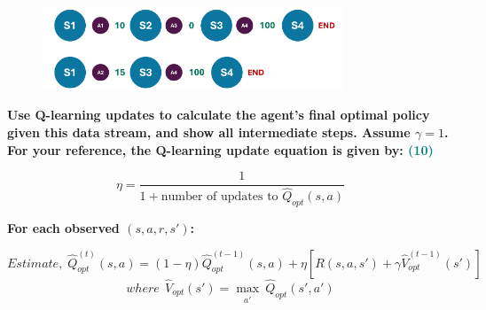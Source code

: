 \documentclass[a4paper]{article}
\begin{document}
\begin{sloppypar}
\begin{enumerate}[start=8,label=Q\arabic*,left=0pt]
    \begin{figure}[H]
        \centering  
        \includegraphics[width=0.8\textwidth]{Q11_mdp.png}
        \label{fig:Q11_mdp}
    \end{figure}

    \textbf{Use Q-learning updates to calculate the agent’s final optimal policy given this data stream,
    and show all intermediate steps. Assume $\gamma = 1$. For your reference, the Q-learning update equation is given by: \hfill \textcolor{teal}{(10)}}
    
    \[ \eta = \frac{1}{1 + \text{number of updates to } \hat{Q}_{opt}(s, a)} \]

    \textbf{For each observed $(s, a, r, s')$:}

    \[ Estimate, \; \hat{Q}^{(t)}_{opt}(s, a) = (1 - \eta) \hat{Q}^{(t-1)}_{opt}(s, a) + \eta[R(s, a, s') + \gamma \hat{V}^{(t-1)}_{opt}(s')] \]
    \[ where \:\: \hat{V}_{opt}(s') = \max_{\substack{a'}} \ \hat{Q}_{opt}(s', a') \]


\end{enumerate}
\end{sloppypar}
\end{document}
